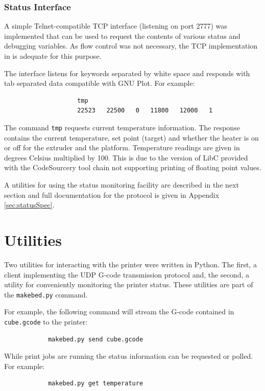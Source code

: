 			\subsubsection{Status Interface}
				
				\label{sec:statusInterface}
				
				A simple Telnet-compatible TCP interface (listening on port 2777) was
				implemented that can be used to request the contents of various status
				and debugging variables. As flow control was not necessary, the TCP
				implementation in \uIP{} is adequate for this purpose.
				
				The interface listens for keywords separated by white space and responds
				with tab separated data compatible with GNU Plot. For example:
				\begin{verbatim}
					tmp
					22523	22500	0	11800	12000	1
				\end{verbatim}
				The command \verb|tmp| requests current temperature information. The
				response contains the current temperature, set point (target) and
				whether the heater is on or off for the extruder and the platform.
				Temperature readings are given in degrees Celsius multiplied by 100. This is
				due to the version of LibC provided with the CodeSourcery tool chain not
				supporting printing of floating point values.
				
				A utilities for using the status monitoring facility are described in
				the next section and full documentation for the protocol is given in
				Appendix \ref{sec:statusSpec}.
	
	
	\section{Utilities}
		
		Two utilities for interacting with the printer were written in Python. The
		first, a client implementing the UDP G-code transmission protocol and, the
		second, a utility for conveniently monitoring the printer status. These
		utilities are part of the \verb|makebed.py| command.
		
		For example, the following command will stream the G-code contained in
		\verb|cube.gcode| to the printer:
		\begin{verbatim}
			makebed.py send cube.gcode
		\end{verbatim}
		
		While print jobs are running the status information can be requested or
		polled. For example:
		\begin{verbatim}
			makebed.py get temperature
		\end{verbatim}
		
